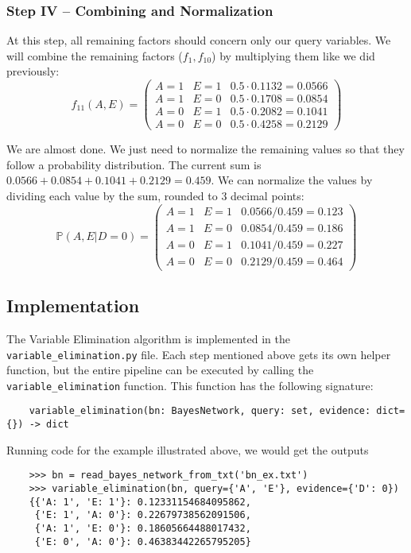 \documentclass{article}
\theoremstyle{definition}
\renewcommand{\P}{\mathbb{P}}
\begin{document}
\subsubsection{Step IV -- Combining and Normalization}

At this step, all remaining factors should concern only our query variables. We will combine the remaining factors (\(f_1, f_{10}\)) by multiplying them like we did previously:
\[f_{11}(A, E) = \begin{pmatrix}
    A = 1 & E = 1 & 0.5\cdot 0.1132 = 0.0566 \\
    A = 1 & E = 0 & 0.5\cdot 0.1708 = 0.0854 \\
    A = 0 & E = 1 & 0.5\cdot 0.2082 = 0.1041 \\
    A = 0 & E = 0 & 0.5\cdot 0.4258 = 0.2129
\end{pmatrix}\]

We are almost done. We just need to normalize the remaining values so that they follow a probability distribution. The current sum is \(0.0566 + 0.0854 + 0.1041 + 0.2129 = 0.459\). We can normalize the values by dividing each value by the sum, rounded to 3 decimal points:
\[\P(A, E | D = 0) = \begin{pmatrix}
    A = 1 & E = 1 & 0.0566/0.459 = 0.123 \\
    A = 1 & E = 0 & 0.0854/0.459 = 0.186 \\
    A = 0 & E = 1 & 0.1041/0.459 = 0.227 \\
    A = 0 & E = 0 & 0.2129/0.459 = 0.464
\end{pmatrix}\]

\subsection{Implementation}

The Variable Elimination algorithm is implemented in the \texttt{variable\_elimination.py} file. Each step mentioned above gets its own helper function, but the entire pipeline can be executed by calling the \texttt{variable\_elimination} function. This function has the following signature:

\begin{verbatim}
    variable_elimination(bn: BayesNetwork, query: set, evidence: dict={}) -> dict
\end{verbatim}

Running code for the example illustrated above, we would get the outputs

\begin{verbatim}
    >>> bn = read_bayes_network_from_txt('bn_ex.txt')
    >>> variable_elimination(bn, query={'A', 'E'}, evidence={'D': 0})
    {{'A: 1', 'E: 1'}: 0.12331154684095862,
     {'E: 1', 'A: 0'}: 0.22679738562091506,
     {'A: 1', 'E: 0'}: 0.18605664488017432,
     {'E: 0', 'A: 0'}: 0.46383442265795205}
\end{verbatim}
\end{document}
